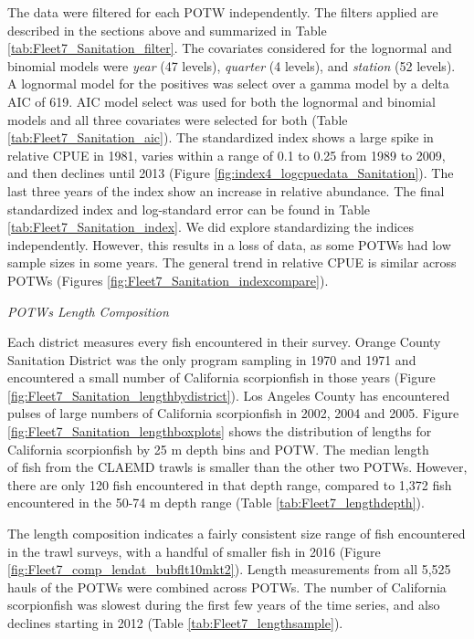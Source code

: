 \documentclass[12pt,]{article}
\begin{document}
The data were filtered for each POTW independently. The filters applied
are described in the sections above and summarized in Table
\ref{tab:Fleet7_Sanitation_filter}. The covariates considered for the
lognormal and binomial models were \emph{year} (47 levels),
\emph{quarter} (4 levels), and \emph{station} (52 levels). A lognormal
model for the positives was select over a gamma model by a delta AIC of
619. AIC model select was used for both the lognormal and binomial
models and all three covariates were selected for both (Table
\ref{tab:Fleet7_Sanitation_aic}). The standardized index shows a large
spike in relative CPUE in 1981, varies within a range of 0.1 to 0.25
from 1989 to 2009, and then declines until 2013 (Figure
\ref{fig:index4_logcpuedata_Sanitation}). The last three years of the
index show an increase in relative abundance. The final standardized
index and log-standard error can be found in Table
\ref{tab:Fleet7_Sanitation_index}. We did explore standardizing the
indices independently. However, this results in a loss of data, as some
POTWs had low sample sizes in some years. The general trend in relative
CPUE is similar across POTWs (Figures
\ref{fig:Fleet7_Sanitation_indexcompare}).

\emph{POTWs Length Composition}

Each district measures every fish encountered in their survey. Orange
County Sanitation District was the only program sampling in 1970 and
1971 and encountered a small number of California scorpionfish in those
years (Figure \ref{fig:Fleet7_Sanitation_lengthbydistrict}). Los Angeles
County has encountered pulses of large numbers of California
scorpionfish in 2002, 2004 and 2005. Figure
\ref{fig:Fleet7_Sanitation_lengthboxplots} shows the distribution of
lengths for California scorpionfish by 25 m depth bins and POTW. The
median length\\
of fish from the CLAEMD trawls is smaller than the other two POTWs.
However, there are only 120 fish encountered in that depth range,
compared to 1,372 fish encountered in the 50-74 m depth range (Table
\ref{tab:Fleet7_lengthdepth}).

The length composition indicates a fairly consistent size range of fish
encountered in the trawl surveys, with a handful of smaller fish in 2016
(Figure \ref{fig:Fleet7_comp_lendat_bubflt10mkt2}). Length measurements
from all 5,525 hauls of the POTWs were combined across POTWs. The number
of California scorpionfish was slowest during the first few years of the
time series, and also declines starting in 2012 (Table
\ref{tab:Fleet7_lengthsample}).
\end{document}
